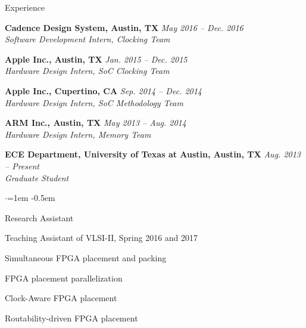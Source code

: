 
\begin{rSection}{Experience}

    
{\bf Cadence Design System, Austin, TX} \hfill {\em May 2016 -- Dec. 2016} \\
\textit{Software Development Intern, Clocking Team}

{\bf Apple Inc., Austin, TX} \hfill {\em Jan. 2015 -- Dec. 2015} \\
\textit{Hardware Design Intern, SoC Clocking Team}

{\bf Apple Inc., Cupertino, CA} \hfill {\em Sep. 2014 -- Dec. 2014} \\
\textit{Hardware Design Intern, SoC Methodology Team}

{\bf ARM Inc., Austin, TX} \hfill {\em May 2013 -- Aug. 2014} \\
\textit{Hardware Design Intern, Memory Team}

{\bf ECE Department, University of Texas at Austin, Austin, TX} \hfill {\em Aug. 2013 -- Present} \\
\textit{Graduate Student}
\begin{list}{$\cdot$}{\leftmargin=1em} %
\itemsep -0.5em \vspace{-0.5em} %
\item Research Assistant
\item Teaching Assistant of VLSI-II, Spring 2016 and 2017
\item Simultaneous FPGA placement and packing
\item FPGA placement parallelization
\item Clock-Aware FPGA placement
\item Routability-driven FPGA placement
\end{list}

\end{rSection}


